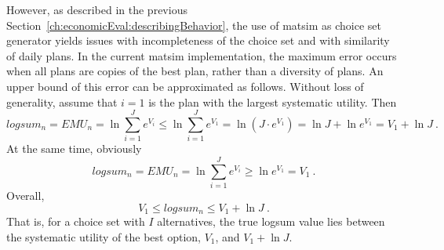 However, as described in the previous Section~\ref{ch:economicEval:describingBehavior}, the use of \acrshort{matsim} as choice set generator yields issues with incompleteness of the choice set and with 
similarity
of daily plans.
%
%
%
%
%
In the current \gls{matsim} implementation, the maximum error occurs when all plans are copies of the best plan, rather than a diversity of plans.
%
An upper bound of this error 
can be approximated as follows.  Without loss of 
generality, assume that $i=1$ is the plan with the largest systematic utility.  Then
\[
logsum_n = EMU_n = \ln \sum_{i=1}^{J} e^{V_{i}}
%
\le \ln \sum_{i=1}^{J} e^{V_{1}}
%
= \ln ( J \cdot e^{V_{1}} )
%
= \ln J + \ln e^{V_{1}}
%
= V_{1} + \ln J \ .
\]
At the same time, obviously
\[
logsum_n = EMU_n = \ln \sum_{i=1}^{J} e^{V_i} \ge \ln e^{V_1} = V_1 \ .
\]
Overall,
\[
V_1 \le logsum_n \le V_1 + \ln J \ .
\]
That is, for a choice set with $I$ alternatives, the true logsum value lies between the systematic utility of the best option, $V_1$, and $V_1 + \ln J$.

